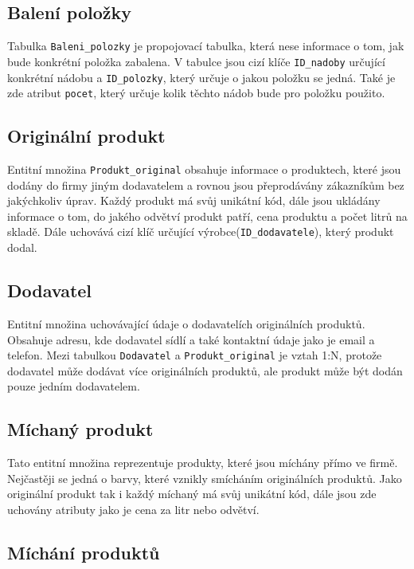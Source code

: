 \subsection{Balení položky}

Tabulka \texttt{Baleni\_polozky} je propojovací tabulka, která nese informace o tom, jak bude konkrétní položka zabalena. V tabulce jsou cizí klíče \texttt{ID\_nadoby} určující konkrétní nádobu a \texttt{ID\_polozky}, který určuje o jakou položku se jedná. Také je zde atribut \texttt{pocet}, který určuje kolik těchto nádob bude pro položku použito.


\subsection{Originální produkt}

Entitní množina \texttt{Produkt\_original} obsahuje informace o produktech, které jsou dodány do firmy jiným dodavatelem a rovnou jsou přeprodávány zákazníkům bez jakýchkoliv úprav. Každý produkt má svůj unikátní kód, dále jsou ukládány informace o tom, do jakého odvětví produkt patří, cena produktu  a počet litrů na skladě. Dále uchovává cizí klíč určující  výrobce(\texttt{ID\_dodavatele}), který produkt dodal.

\subsection{Dodavatel}

Entitní množina uchovávající údaje o dodavatelích originálních produktů. Obsahuje adresu, kde dodavatel sídlí a také kontaktní údaje jako je email a telefon. Mezi tabulkou \texttt{Dodavatel} a \texttt{Produkt\_original} je vztah 1:N, protože dodavatel může dodávat více originálních produktů, ale produkt může být dodán pouze jedním dodavatelem.

\subsection{Míchaný produkt}

Tato entitní množina reprezentuje produkty, které jsou míchány přímo ve firmě. Nejčastěji se jedná o barvy, které vznikly smícháním originálních produktů. Jako originální produkt tak i každý míchaný má svůj unikátní kód, dále jsou zde uchovány atributy jako je cena za litr nebo odvětví.

\subsection{Míchání produktů}

